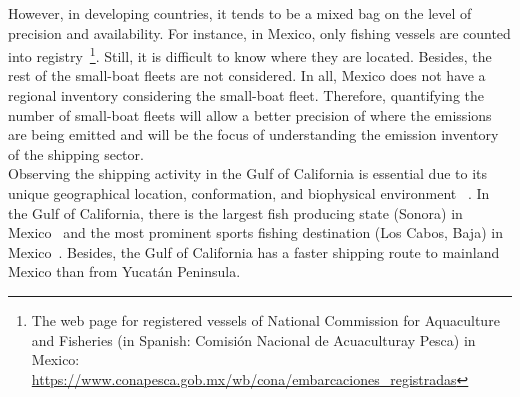 However, in developing countries, it tends to be a mixed bag on the level of precision and availability. For instance, in Mexico, only fishing vessels are counted into registry~\footnote{The web page for registered vessels of National Commission for Aquaculture and Fisheries (in Spanish: Comisión Nacional de Acuaculturay Pesca) in Mexico: \href{https://www.conapesca.gob.mx/wb/cona/embarcaciones_registradas}{https://www.conapesca.gob.mx/wb/cona/embarcaciones\_registradas}}. Still, it is difficult to know where they are located. Besides, the rest of the small-boat fleets are not considered. In all, Mexico does not have a regional  inventory considering the small-boat fleet. Therefore, quantifying the number of small-boat fleets will allow a better precision of where the emissions are being emitted and will be the focus of understanding the emission inventory of the shipping sector.\\


Observing the shipping activity in the Gulf of California is essential due to its unique geographical location, conformation, and biophysical environment ~\cite{LLUCHCOTA20071, munguia2018ecological, MARINONE2012133}. In the Gulf of California, there is the largest fish producing state (Sonora) in Mexico~\cite{MELTZER2006222} and the most prominent sports fishing destination (Los Cabos, Baja) in Mexico~\cite{hernandez2012economic}. Besides, the Gulf of California has a faster shipping route to mainland Mexico than from Yucatán Peninsula.






